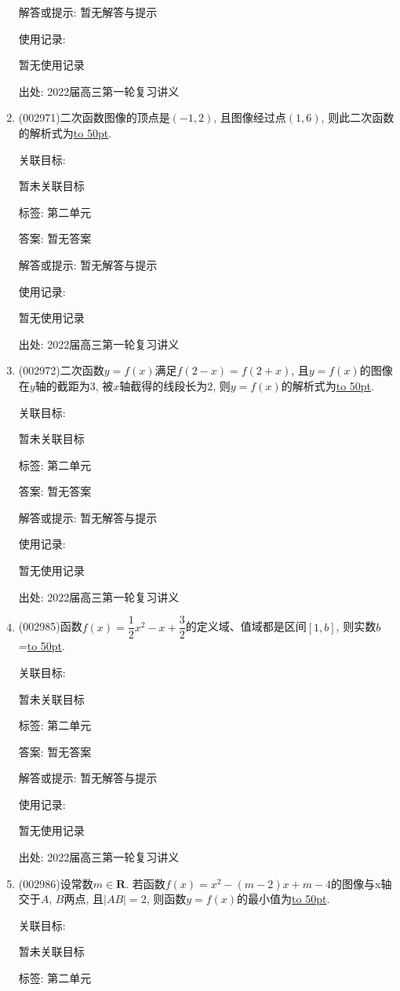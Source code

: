 \documentclass[10pt,a4paper]{article}
\newcommand{\blank}[1]{\underline{\hbox to #1pt{}}}
\begin{document}
\begin{enumerate}[1.]
解答或提示: 暂无解答与提示

使用记录:

暂无使用记录


出处: 2022届高三第一轮复习讲义
\item { (002971)}二次函数图像的顶点是$(-1,2)$, 且图像经过点$(1,6)$, 则此二次函数的解析式为\blank{50}.


关联目标:

暂未关联目标



标签: 第二单元

答案: 暂无答案

解答或提示: 暂无解答与提示

使用记录:

暂无使用记录


出处: 2022届高三第一轮复习讲义
\item { (002972)}二次函数$y=f(x)$满足$f(2-x)=f(2+x)$, 且$y=f(x)$的图像在$y$轴的截距为$3$, 被$x$轴截得的线段长为$2$, 则$y=f(x)$的解析式为\blank{50}.


关联目标:

暂未关联目标



标签: 第二单元

答案: 暂无答案

解答或提示: 暂无解答与提示

使用记录:

暂无使用记录


出处: 2022届高三第一轮复习讲义
\item { (002985)}函数$f(x)=\dfrac 12x^2-x+\dfrac 32$的定义域、值域都是区间$[1,b]$, 则实数$b$=\blank{50}.


关联目标:

暂未关联目标



标签: 第二单元

答案: 暂无答案

解答或提示: 暂无解答与提示

使用记录:

暂无使用记录


出处: 2022届高三第一轮复习讲义
\item { (002986)}设常数$m\in \mathbf{R}$. 若函数$f(x)=x^2-(m-2)x+m-4$的图像与x轴交于$A$, $B$两点, 且$|AB|=2$, 则函数$y=f(x)$的最小值为\blank{50}.


关联目标:

暂未关联目标



标签: 第二单元


\end{enumerate}
\end{document}
